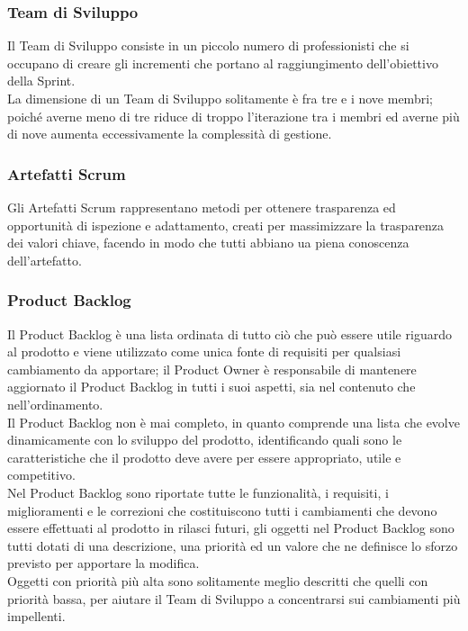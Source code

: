 \subsubsection{Team di Sviluppo}
Il Team di Sviluppo consiste in un piccolo numero di professionisti che si occupano di creare gli incrementi che portano al raggiungimento dell'obiettivo della Sprint.
\\
La dimensione di un Team di Sviluppo solitamente è fra tre e i nove membri; poiché averne meno di tre riduce di troppo l'iterazione tra i membri ed averne più di nove aumenta eccessivamente la complessità di gestione.
\subsubsection{Artefatti Scrum}
Gli Artefatti Scrum rappresentano metodi per ottenere trasparenza ed opportunità di ispezione e adattamento, creati per massimizzare la trasparenza dei valori chiave, facendo in modo che tutti abbiano ua piena conoscenza dell'artefatto.
\subsubsection{Product Backlog}
Il Product Backlog è una lista ordinata di tutto ciò che può essere utile riguardo al prodotto e viene utilizzato come unica fonte di requisiti per qualsiasi cambiamento da apportare; il Product Owner è responsabile di mantenere aggiornato il Product Backlog in tutti i suoi aspetti, sia nel contenuto che nell'ordinamento.
\\
Il Product Backlog non è mai completo, in quanto comprende una lista che evolve dinamicamente con lo sviluppo del prodotto, identificando quali sono le caratteristiche che il prodotto deve avere per essere appropriato, utile e competitivo.
\\
Nel Product Backlog sono riportate tutte le funzionalità, i requisiti, i miglioramenti e le correzioni che costituiscono tutti i cambiamenti che devono essere effettuati al prodotto in rilasci futuri, gli oggetti nel Product Backlog sono tutti dotati di una descrizione, una priorità ed un valore che ne definisce lo sforzo previsto per apportare la modifica.
\\
Oggetti con priorità più alta sono solitamente meglio descritti che quelli con priorità bassa, per aiutare il Team di Sviluppo a concentrarsi sui cambiamenti più impellenti.
